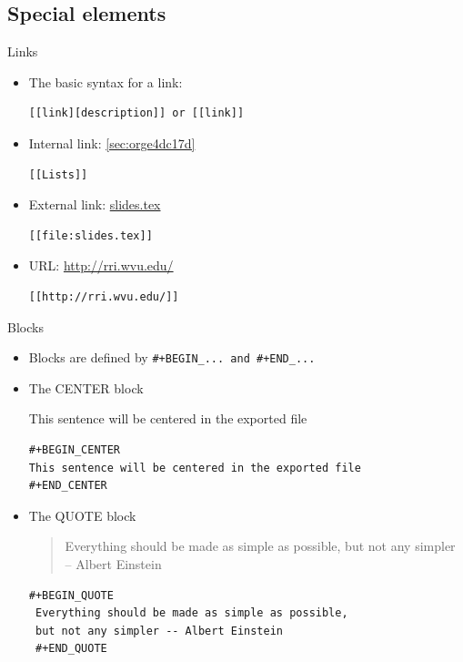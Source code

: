 \documentclass[presentation]{beamer}
\begin{document}
\subsection{Special elements}
\label{sec:orgabf2fdb}

\begin{frame}[fragile,label={sec:org14e52ab}]{Links}
 \begin{itemize}
\item The basic syntax for a link:
\begin{verbatim}
[[link][description]] or [[link]]
\end{verbatim}

\item Internal link: \ref{sec:orge4dc17d}
\begin{verbatim}
[[Lists]]
\end{verbatim}

\item External link: \url{slides.tex}
\begin{verbatim}
[[file:slides.tex]]
\end{verbatim}

\item URL: \url{http://rri.wvu.edu/}
\begin{verbatim}
[[http://rri.wvu.edu/]]
\end{verbatim}
\end{itemize}
\end{frame}

\begin{frame}[fragile,label={sec:org2c5d5ca}]{Blocks}
 \begin{itemize}
\item Blocks are defined by \texttt{\#+BEGIN\_... and \#+END\_...}

\item The CENTER block

\begin{center}
This sentence will be centered in the exported file
\end{center}

\begin{verbatim}
#+BEGIN_CENTER
This sentence will be centered in the exported file
#+END_CENTER
\end{verbatim}

\item The QUOTE block

\begin{quote}
Everything should be made as simple as possible,
but not any simpler -- Albert Einstein
\end{quote}

\begin{verbatim}
#+BEGIN_QUOTE
 Everything should be made as simple as possible,
 but not any simpler -- Albert Einstein
 #+END_QUOTE
\end{verbatim}
\end{itemize}
\end{frame}
\end{document}
